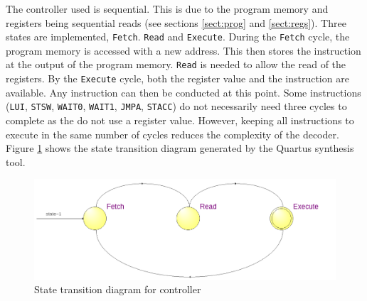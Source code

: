 


The controller used is sequential. 
This is due to the program memory and registers being sequential reads (see sections \ref{sect:prog} and \ref{sect:regs}).
Three states are implemented, \texttt{Fetch}. \texttt{Read} and \texttt{Execute}. 
During the \texttt{Fetch} cycle, the program memory is accessed with a new address. 
This then stores the instruction at the output of the program memory. 
\texttt{Read} is needed to allow the read of the registers. 
By the \texttt{Execute} cycle, both the register value and the instruction are available. 
Any instruction can then be conducted at this point.
Some instructions (\texttt{LUI}, \texttt{STSW}, \texttt{WAIT0}, \texttt{WAIT1}, \texttt{JMPA}, \texttt{STACC}) do not necessarily need three cycles to complete as the do not use a register value.
However, keeping all instructions to execute in the same number of cycles reduces the complexity of the decoder. 
Figure \ref{fig:controllerasm} shows the state transition diagram generated by the Quartus synthesis tool.

\begin{figure}
\includegraphics[width=\textwidth]{Figures/cpu_control_state.png}
\caption{State transition diagram for controller}
\label{fig:controllerasm}
\end{figure}

